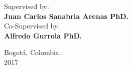 \begin{center}
\large {Supervised by:}\\
\textbf{Juan Carlos Sanabria Arenas PhD.}\\
\vspace{0.5em}
\large {Co-Supervised by:}\\
\textbf{Alfredo Gurrola PhD.}
\end{center}

\vspace{1.5em}
\begin{center}
Bogotá, Colombia.\\
2017
\end{center}












